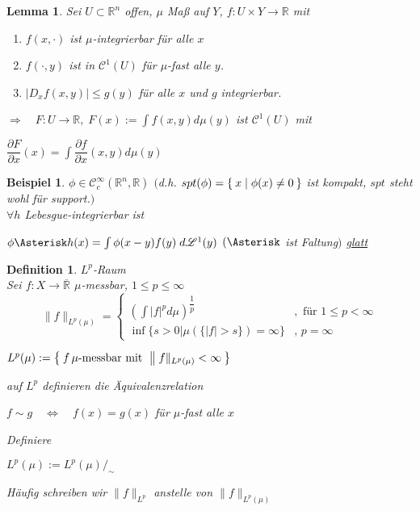 \documentclass[11pt]{memoir}
\theoremstyle{changebreak}
\newtheorem{Definition}{Definition}[chapter]
\newtheorem{Beispiel}{Beispiel}[chapter]
\newtheorem{Lemma}{Lemma}[chapter]
\begin{document}
\begin{Lemma}
Sei $U \subset \mathbb R^n$ offen, $\mu$ Maß auf $Y$, $f: U \times Y \rightarrow \mathbb R$ mit
\begin{enumerate}
	\item $f(x, \cdotp)$ ist $\mu$-integrierbar für alle $x$
	\item $f(\cdotp, y)$ ist in $\mathscr C^1(U)$ für $\mu$-fast alle $y$.
	\item $|D_x f(x, y)| \leq g(y)$ für alle $x$ und $g$ integrierbar. \\
\end{enumerate}
$\Rightarrow \quad F: U \rightarrow \mathbb R, \;F(x):= \int f(x, y) d\mu(y)$ ist $\mathscr C^1(U)$ mit 
\begin{center}
	$\dfrac{\partial F}{\partial x}(x) = \int \dfrac{\partial f}{\partial x}(x, y) d\mu(y)$
\end{center}
\end{Lemma}

\begin{Beispiel}
$\phi \in \mathscr C_c^\infty(\mathbb R^n, \mathbb R)$ $($d.h. $spt(\phi) = \Set{x| \phi(x) \ne 0}$ ist kompakt, $spt$ steht wohl für support.$)$  \\
$\forall h$ Lebesgue-integrierbar ist \\
\begin{center}
	$\phi \Asterisk h(x) = \int \phi(x-y)f(y)\; d\mathscr L^1(y)$ $(\Asterisk$ ist \emph{Faltung}$)$ \quad\underline{glatt}
\end{center}
\end{Beispiel}


\begin{Definition}
\emph{$L^p$-Raum} \\
Sei $f: X \rightarrow \overline{\mathbb R}$ $\mu$-messbar, $1 \leq p \leq \infty$ \\
\begin{equation}
\|f\|_{L^p (\mu)} =
\begin{cases}
	\left( \int |f|^p d\mu\right) ^{\dfrac{1}{p}} & , \text{ für } 1 \leq p < \infty \\
	\inf \{s > 0 | \mu(\{|f| > s\}) = \infty \} & ,\, p = \infty
\end{cases}
\end{equation}
\begin{center}
	$L^p(\mu):= \Set{f \, \mu\text{-messbar mit }\|f\|_{L^p (\mu)} < \infty}$
\end{center}
auf $L^p$ definieren die Äquivalenzrelation
\begin{center}
	$f \sim g \quad \Leftrightarrow \quad f(x) = g(x)$ für $\mu$-fast alle $x$
\end{center}
Definiere 
\begin{center}
	$L^p(\mu) := L^p(\mu) /_\sim$ 
\end{center}
Häufig schreiben wir $\|f\|_{L^p}$ anstelle von $\|f\|_{L^p (\mu)}$
\end{Definition}
\end{document}
